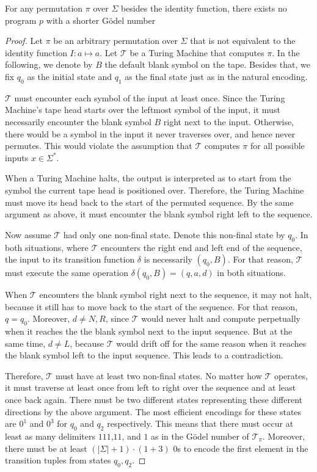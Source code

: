 \begin{lemma}
	\label{lemma:optimality-permutation-tm}
	For any permutation $\pi$ over $\Sigma$ besides the identity function, there exists no program $p$ with a shorter G\"odel number
\end{lemma}
\begin{proof}
	Let $\pi$ be an arbitrary permutation over $\Sigma$ that is not equivalent to the identity function $I:a\mapsto a$.
	Let $\mathcal{T}$ be a Turing Machine that computes $\pi$.
	In the following, we denote by $B$ the default blank symbol on the tape.
	Besides that, we fix $q_0$ as the initial state and $q_1$ as the final state just as in the natural encoding.
	
	$\mathcal{T}$ must encounter each symbol of the input at least once.
	Since the Turing Machine's tape head starts over the leftmost symbol of the input, it must necessarily encounter the blank symbol $B$ right next to the input.
	Otherwise, there would be a symbol in the input it never traverses over, and hence never permutes. This would violate the assumption that $\mathcal{T}$ computes $\pi$ for all possible inputs $x\in\Sigma^{*}$.
	
	When a Turing Machine halts, the output is interpreted as to start from the symbol the current tape head is positioned over.
	Therefore, the Turing Machine must move its head back to the start of the permuted sequence. By the same argument as above, it must encounter the blank symbol right left to the sequence.
	
	Now assume $\mathcal{T}$ had only one non-final state. Denote this non-final state by $q_0$. 
	In both situations, where $\mathcal{T}$ encounters the right end and left end of the sequence, the input to its transition function $\delta$ is necessarily $(q_0,B)$. For that reason, $\mathcal{T}$ must execute the same operation $\delta(q_0,B)=(q,a,d)$ in both situations. 
	
	When $\mathcal{T}$ encounters the blank symbol right next to the sequence, it may not halt, because it still has to move back to the start of the sequence. For that reason, $q=q_0$. 
	Moreover, $d\neq N,R$, since $\mathcal{T}$ would never halt and compute perpetually when it reaches the the blank symbol next to the input sequence. 
	But at the same time, $d\neq L$, because $\mathcal{T}$ would drift off for the same reason when it reaches the blank symbol left to the input sequence.
	This leads to a contradiction. \text{\Lightning}
	
	Therefore, $\mathcal{T}$ must have at least two non-final states. No matter how $\mathcal{T}$ operates, it must traverse at least once from left to right over the sequence and at least once back again. There must be two different states representing these different directions by the above argument. The most efficient encodings for these states are $0^1$ and $0^3$ for $q_0$ and $q_2$ respectively. 
	This means that there must occur at least as many delimiters $111$,$11$, and $1$ as in the G\"odel number of $\mathcal{T}_\pi$.
	Moreover, there must be at least $(|\Sigma|+1)\cdot (1+3)$ $0$s to encode the first element in the transition tuples from states $q_0,q_2$.
	

\end{proof}
